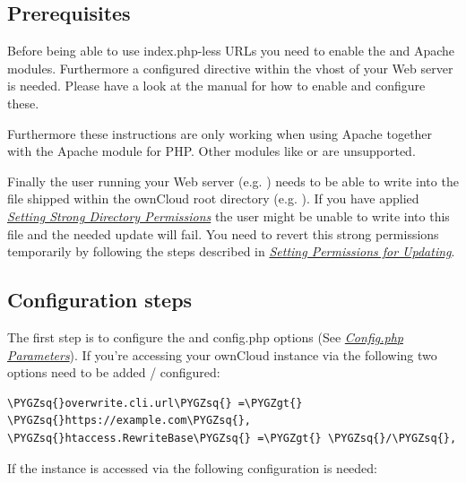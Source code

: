 \documentclass[letterpaper,10pt,english]{sphinxmanual}
\def\PYGZgt{\char`\>}
\def\PYGZsq{\char`\'}
\begin{document}
\subsection{Prerequisites}
\label{configuration_server/index_php_less_urls:prerequisites}
Before being able to use index.php-less URLs you need to enable the  and
 Apache modules. Furthermore a configured  directive
within the vhost of your Web server is needed. Please have a look at the  manual
for how to enable and configure these.

Furthermore these instructions are only working when using Apache together with the 
Apache module for PHP. Other modules like  or  are unsupported.

Finally the user running your Web server (e.g. ) needs to be able to write into the
 file shipped within the ownCloud root directory (e.g. ).
If you have applied {\hyperref[installation/installation_wizard:strong-perms-label]{\emph{Setting Strong Directory Permissions}}} the user might be unable to write into this
file and the needed update will fail. You need to revert this strong permissions temporarily by
following the steps described in {\hyperref[maintenance/update:set-updating-permissions-label]{\emph{Setting Permissions for Updating}}}.


\subsection{Configuration steps}
\label{configuration_server/index_php_less_urls:configuration-steps}
The first step is to configure the  and 
config.php options (See {\hyperref[configuration_server/config_sample_php_parameters::doc]{\emph{Config.php Parameters}}}). If you're accessing
your ownCloud instance via  the following two options need
to be added / configured:

\begin{Verbatim}[commandchars=\\\{\}]
\PYGZsq{}overwrite.cli.url\PYGZsq{} =\PYGZgt{} \PYGZsq{}https://example.com\PYGZsq{},
\PYGZsq{}htaccess.RewriteBase\PYGZsq{} =\PYGZgt{} \PYGZsq{}/\PYGZsq{},
\end{Verbatim}

If the instance is accessed via  the following
configuration is needed:
\end{document}
